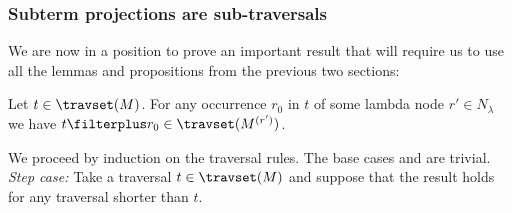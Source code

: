 \subsubsection{Subterm projections are sub-traversals}

We are now in a position to prove an important result that will require us to use all the lemmas and propositions from the previous two sections:
\begin{proposition}
    \label{prop:trav_projection}
    Let $t \in \travset(M)$. For any occurrence $r_0$ in $t$ of some lambda node
    $r'\in N_\lambda$ we have $t\filterplus r_0 \in \travset(M^{(r')})$.
\end{proposition}
\proof
    We proceed by induction on the traversal rules. The base cases  and
     are trivial. \emph{Step case:} Take a traversal $t \in \travset(M)$ and suppose that the result holds for any traversal shorter than $t$.

